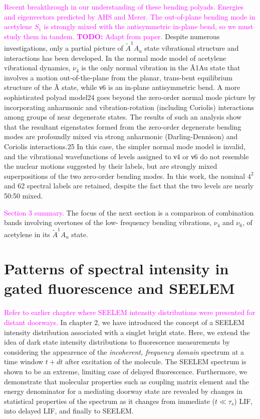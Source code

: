 \documentclass[12pt,draft]{mitthesis}
\newcommand{\TODO} [1]{\textcolor{magenta}{\textbf{TODO:} #1}}
\newcommand{\POINT}[1]{\textcolor{magenta}{#1}}
\begin{document}
\POINT{Recent breakthrough in our understanding of these bending
  polyads.  Energies and eigenvectors predicted by AHS and Merer.  The
  out-of-plane bending mode in acetylene $S_1$ is strongly mixed with
  the antisymmetric in-plane bend, so we must study them in tandem.}
\TODO{Adapt from paper.}  Despite numerous investigations, only a
partial picture of $\tilde{A} ^1A_u$ state vibrational structure and
interactions has been developed.  In the normal mode model of
acetylene vibrational dynamics, $\nu_4$ is the only normal vibration
in the Ã1Au state that involves a motion out-of-the-plane from the
planar, trans-bent equilibrium structure of the Ã state, while ν6 is
an in-plane antisymmetric bend. A more sophisticated polyad model24
goes beyond the zero-order normal mode picture by incorporating
anharmonic and vibration-rotation (including Coriolis) interactions
among groups of near degenerate states. The results of such an
analysis show that the resultant eigenstates formed from the
zero-order degenerate bending modes are profoundly mixed via strong
anharmonic (Darling-Dennison) and Coriolis interactions.25 In this
case, the simpler normal mode model is invalid, and the vibrational
wavefunctions of levels assigned to ν4 or ν6 do not resemble the
nuclear motions suggested by their labels, but are strongly mixed
superpositions of the two zero-order bending modes.  In this work, the
nominal $4^2$ and 62 spectral labels are retained, despite the fact
that the two levels are nearly 50:50 mixed.

\POINT{Section 3 summary.}  The focus of the next section is a
comparison of combination bands involving overtones of the low-
frequency bending vibrations, $\nu_4$ and $\nu_6$, of acetylene in its
$\tilde{A} ^1A_u$ state.



\section{Patterns of spectral intensity in gated fluorescence and
  SEELEM}

\POINT{Refer to earlier chapter where SEELEM intensity distributions
  were presented for distant doorways.}  In chapter 2, we have
introduced the concept of a SEELEM intensity distribution associated
with a singlet bright state.  Here, we extend the idea of dark state
intensity distributions to fluorescence measurements by considering
the appearence of the \emph{incoherent, frequency domain} spectrum at
a time window $t+dt$ after excitation of the molecule.  The SEELEM
spectrum is shown to be an extreme, limiting case of delayed
fluorescence.  Furthermore, we demonstrate that molecular properties
such as coupling matrix element and the energy denominator for a
mediating doorway state are revealed by changes in statistical
properties of the spectrum as it changes from immediate ($t\ll\tau_s$)
LIF, into delayed LIF, and finally to SEELEM.
\end{document}
